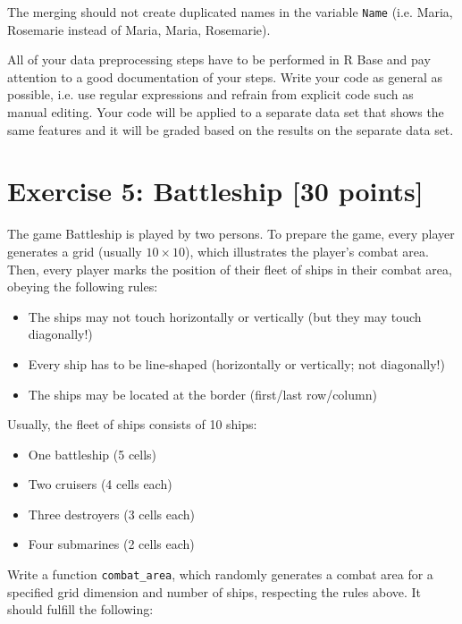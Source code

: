 \documentclass[a4paper,11pt]{article}
\begin{document}
\noindent The merging should not create duplicated names in the variable \texttt{Name} (i.e. Maria, Rosemarie instead of Maria, Maria, Rosemarie).

\noindent All of your data preprocessing steps have to be performed in R Base and pay attention to a good documentation of your steps. Write your code as general as possible, i.e. use regular expressions and refrain from explicit code such as manual editing. Your code will be applied to a separate data set that shows the same features and it will be graded based on the results on the separate data set.

\newpage

\section*{Exercise 5: Battleship [30 points]}

The game Battleship is played by two persons. To prepare the game, every player generates a grid (usually $10 \times 10$), which illustrates the player's combat area. Then, every player marks the position of their fleet of ships in their combat area, obeying the following rules:

\begin{itemize}
    \item The ships may not touch horizontally or vertically (but they may touch diagonally!)
    \item Every ship has to be line-shaped (horizontally or vertically; not diagonally!)
    \item The ships may be located at the border (first/last row/column)
\end{itemize}

\noindent Usually, the fleet of ships consists of 10 ships:
\begin{itemize}
    \item One battleship (5 cells)
    \item Two cruisers (4 cells each)
    \item Three destroyers (3 cells each)
    \item Four submarines (2 cells each)
\end{itemize}

\noindent Write a function \texttt{combat\_area}, which randomly generates a combat area for a specified grid dimension and number of ships, respecting the rules above. It should fulfill the following:
\end{document}
